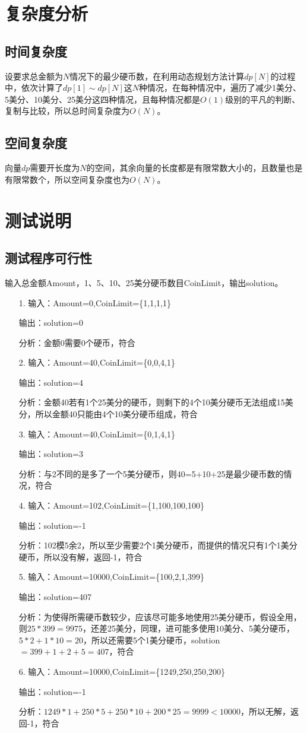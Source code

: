 \documentclass[UTF8]{ctexart}
\begin{document}
\section{复杂度分析}
\subsection{时间复杂度}
设要求总金额为$N$情况下的最少硬币数，在利用动态规划方法计算$dp[N]$的过程中，依次计算了$dp[1]\sim dp[N]$这$N$种情况，在每种情况中，遍历了减少1美分、5美分、10美分、25美分这四种情况，且每种情况都是$O(1)$级别的平凡的判断、复制与比较，所以总时间复杂度为$O(N)$。
\subsection{空间复杂度}
向量$dp$需要开长度为$N$的空间，其余向量的长度都是有限常数大小的，且数量也是有限常数个，所以空间复杂度也为$O(N)$。
\section{测试说明}
\subsection{测试程序可行性}
输入总金额Amount，1、5、10、25美分硬币数目CoinLimit，输出solution。
\begin{itemize}
    \item [1.]输入：Amount=0,\quad CoinLimit=\{1,1,1,1\}\par
    输出：solution=0\par
    分析：金额0需要0个硬币，符合
    \item [2.]输入：Amount=40,\quad CoinLimit=\{0,0,4,1\}\par
    输出：solution=4\par
    分析：金额40若有1个25美分的硬币，则剩下的4个10美分硬币无法组成15美分，所以金额40只能由4个10美分硬币组成，符合
    \item [3.]输入：Amount=40,\quad CoinLimit=\{0,1,4,1\}\par
    输出：solution=3\par
    分析：与2不同的是多了一个5美分硬币，则40=5+10+25是最少硬币数的情况，符合
    \item [4.]输入：Amount=102,\quad CoinLimit=\{1,100,100,100\}\par
    输出：solution=-1\par
    分析：102模5余2，所以至少需要2个1美分硬币，而提供的情况只有1个1美分硬币，所以没有解，返回-1，符合
    \item [5.]输入：Amount=10000,\quad CoinLimit=\{100,2,1,399\}\par
    输出：solution=407\par
    分析：为使得所需硬币数较少，应该尽可能多地使用25美分硬币，假设全用，则$25*399=9975$，还差25美分，同理，进可能多使用10美分、5美分硬币，$5*2+1*10=20$，所以还需要5个1美分硬币，solution$=399+1+2+5=407$，符合
    \item [6.]输入：Amount=10000,\quad CoinLimit=\{1249,250,250,200\}\par
    输出：solution=-1\par
    分析：$1249*1+250*5+250*10+200*25=9999<10000$，所以无解，返回-1，符合
\end{itemize}
\end{document}
